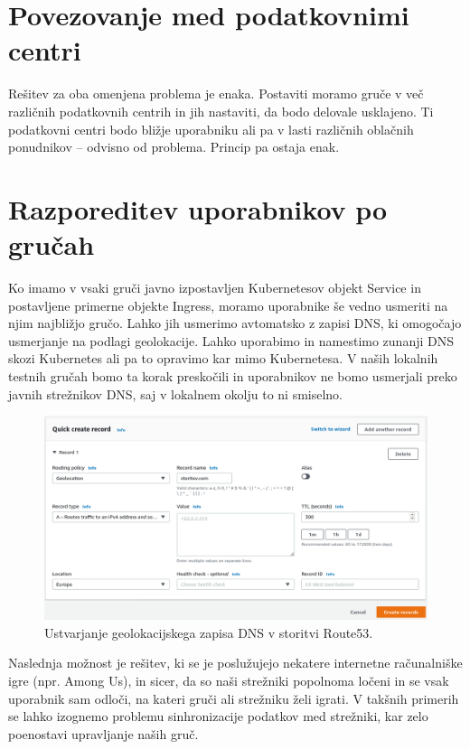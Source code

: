 \documentclass[a4paper, 12pt]{book}
\begin{document}
\section{Povezovanje med podatkovnimi centri}
Rešitev za oba omenjena problema je enaka.
Postaviti moramo gruče v več različnih podatkovnih centrih in jih nastaviti, da bodo delovale usklajeno.
Ti podatkovni centri bodo bližje uporabniku ali pa v lasti različnih oblačnih ponudnikov -- odvisno od problema.
Princip pa ostaja enak.
\section{Razporeditev uporabnikov po gručah}
Ko imamo v vsaki gruči javno izpostavljen Kubernetesov objekt Service in postavljene primerne objekte Ingress, moramo uporabnike še vedno usmeriti na njim najbližjo gručo.
Lahko jih usmerimo avtomatsko z zapisi DNS, ki omogočajo usmerjanje na podlagi geolokacije.
Lahko uporabimo in namestimo zunanji DNS skozi Kubernetes ali pa to opravimo kar mimo Kubernetesa.
V naših lokalnih testnih gručah bomo ta korak preskočili in uporabnikov ne bomo usmerjali preko javnih strežnikov DNS, saj v lokalnem okolju to ni smiselno.
\begin{figure}[h]
\begin{center}
\includegraphics[width=1.0\textwidth]{images/geolokacijski-dns.png}
\end{center}
  \caption{Ustvarjanje geolokacijskega zapisa DNS v storitvi Route53.}
\label{primer-ustvarjanje-geolokacijskega-zapisa}
\end{figure}

Naslednja možnost je rešitev, ki se je poslužujejo nekatere internetne računalniške igre (npr. Among Us), in sicer, da so naši strežniki popolnoma ločeni in se vsak uporabnik sam odloči, na kateri gruči ali strežniku želi igrati.
V takšnih primerih se lahko izognemo problemu sinhronizacije podatkov med strežniki, kar zelo poenostavi upravljanje naših gruč.
\end{document}
